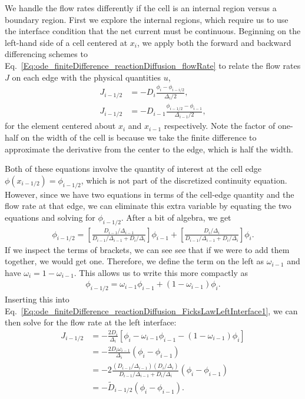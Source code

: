We handle the flow rates differently if the cell is an internal region versus a boundary region. First we explore the internal regions, which require us to use the interface condition that the net current must be continuous. Beginning on the left-hand side of a cell centered at $x_i$, we apply both the forward and backward differencing schemes to Eq.~\eqref{Eq:ode_finiteDifference_reactionDiffusion_flowRate} to relate the flow rates $J$ on each edge with the physical quantities $u$,
\begin{subequations}
\begin{align}
  J_{i-1/2} &= -D_{i}   \frac{ \phi_{i}     - \phi_{i-i/2} }{ \Delta_{i}/2 }, \label{Eq:ode_finiteDifference_reactionDiffusion_FicksLawLeftInterface1} \\
  J_{i-1/2} &= -D_{i-1} \frac{ \phi_{i-1/2} - \phi_{i-1}   }{ \Delta_{i-1}/2 },
\end{align}
\end{subequations}
for the element centered about $x_i$ and $x_{i-1}$ respectively. Note the factor of one-half on the width of the cell is because we take the finite difference to approximate the derivative from the center to the edge, which is half the width.

Both of these equations involve the quantity of interest at the cell edge $\phi(x_{i-1/2}) = \phi_{i-1/2}$, which is not part of the discretized continuity equation. However, since we have two equations in terms of the cell-edge quantity and the flow rate at that edge, we can eliminate this extra variable by equating the two equations and solving for $\phi_{i-1/2}$. After a bit of algebra, we get
\begin{align}
  \phi_{i-1/2} = \left[ \frac{ D_{i-1} / \Delta_{i-1} }{ D_{i-1}/\Delta_{i-1} + D_{i}/\Delta_{i} } \right] \phi_{i-1} + \left[ \frac{ D_i / \Delta_i }{ D_{i-1}/\Delta_{i-1} + D_{i}/\Delta_{i} } \right] \phi_i . 
\end{align}
If we inspect the terms of brackets, we can see see that if we were to add them together, we would get one. Therefore, we define the term on the left as $\omega_{i-1}$ and have $\omega_i = 1 - \omega_{i-1}$. This allows us to write this more compactly as
\begin{align}
  \phi_{i-1/2} = \omega_{i-1} \phi_{i-1} + ( 1 - \omega_{i-1} ) \phi_i .
\end{align}
Inserting this into Eq.~\eqref{Eq:ode_finiteDifference_reactionDiffusion_FicksLawLeftInterface1}, we can then solve for the flow rate at the left interface:
\begin{align}
  J_{i-1/2} &= -\frac{2 D_{i}}{\Delta_i} \left[ \phi_i - \omega_{i-1} \phi_{i-1} - ( 1 - \omega_{i-1} ) \phi_i \right] \nonumber \\
  			&= -\frac{2 D_{i} \omega_{i-1} }{\Delta_i} ( \phi_i - \phi_{i-1} ) \nonumber \\
			&= -2 \frac{ ( D_{i-1} / \Delta_{i-1} ) ( D_i / \Delta_i ) }{ D_{i-1} / \Delta_{i-1} + D_i / \Delta_i } ( \phi_i - \phi_{i-1} ) \nonumber \\
			&= -\widetilde{D}_{i-1/2} ( \phi_i - \phi_{i-1} ) .
\end{align}

